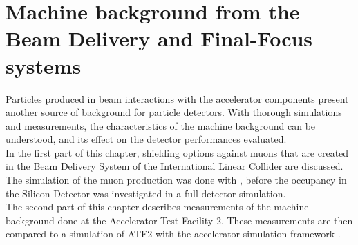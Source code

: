 \chapter{Machine background from the Beam Delivery and Final-Focus systems}

\begin{chapterabstract}
 Particles produced in beam interactions with the accelerator components present another source of background for particle detectors.
 With thorough simulations and measurements,  the characteristics of the machine background can be understood, and its effect on the detector performances evaluated.
 \\In the first part of this chapter, shielding options against muons that are created in the Beam Delivery System of the International Linear Collider are discussed.
 The simulation of the muon production was done with \mucarlo, before the occupancy in the Silicon Detector was investigated in a full detector simulation.
 \\The second part of this chapter describes measurements of the machine background done at the Accelerator Test Facility 2.
 These measurements are then compared to a simulation of ATF2 with the accelerator simulation framework \bdsim.
\end{chapterabstract}

